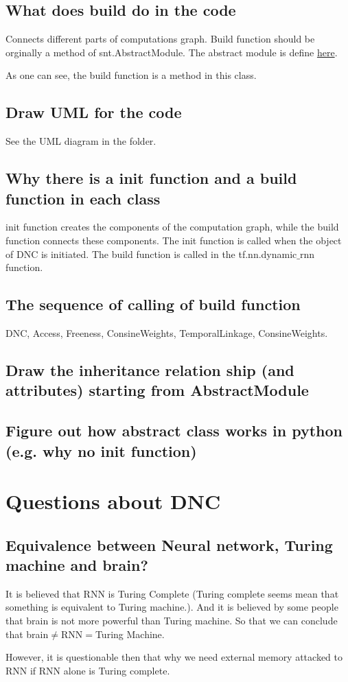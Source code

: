 \documentclass{article}
\begin{document}
\subsection{What does build do in the code}
Connects different parts of computations graph. Build function should be orginally a method of snt.AbstractModule. The abstract module is define 
\href{https://github.com/deepmind/sonnet/blob/master/sonnet/python/modules/base.py}{here}.

As one can see, the build function is a method in this class.
\subsection{Draw UML for the code}
See the UML diagram in the folder.
\subsection{Why there is a init function and a build function in each class}
init function creates the components of the computation graph, while the build function connects these components. The init function is called when the object of DNC is initiated. The build function is called in the tf.nn.dynamic$\_$rnn function.
\subsection{The sequence of calling of build function}
DNC, Access, Freeness, ConsineWeights, TemporalLinkage, ConsineWeights.
\subsection{Draw the inheritance relation ship (and attributes) starting from AbstractModule}
\subsection{Figure out how abstract class works in python (e.g. why no init function)}

\section{Questions about DNC}
\subsection{Equivalence between Neural network, Turing machine and brain?}
It is believed that RNN is Turing Complete (Turing complete seems mean that something is equivalent to Turing machine.). And it is believed by some people that brain is not more powerful than Turing machine. So that we can conclude that brain$\neq$RNN$=$Turing Machine.

However, it is questionable then that why we need external memory attacked to RNN if RNN alone is Turing complete.
\end{document}
